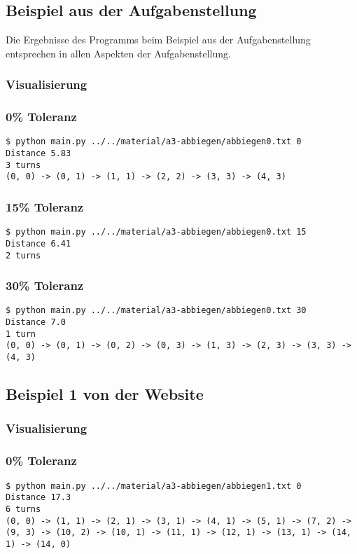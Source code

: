 \documentclass[a4paper,10pt,ngerman]{scrartcl}
\begin{document}
\subsection{Beispiel aus der Aufgabenstellung}
Die Ergebnisse des Programms beim Beispiel aus der Aufgabenstellung entsprechen in allen Aspekten der Aufgabenstellung.
\subsubsection{Visualisierung}


\subsubsection{0\% Toleranz}
\begin{lstlisting}
$ python main.py ../../material/a3-abbiegen/abbiegen0.txt 0
Distance 5.83
3 turns
(0, 0) -> (0, 1) -> (1, 1) -> (2, 2) -> (3, 3) -> (4, 3)
\end{lstlisting}

\subsubsection{15\% Toleranz}
\begin{lstlisting}
$ python main.py ../../material/a3-abbiegen/abbiegen0.txt 15
Distance 6.41
2 turns
\end{lstlisting}

\subsubsection{30\% Toleranz}
\begin{lstlisting}
$ python main.py ../../material/a3-abbiegen/abbiegen0.txt 30
Distance 7.0
1 turn
(0, 0) -> (0, 1) -> (0, 2) -> (0, 3) -> (1, 3) -> (2, 3) -> (3, 3) -> (4, 3)
\end{lstlisting}

\subsection{Beispiel 1 von der Website}
\subsubsection{Visualisierung}


\subsubsection{0\% Toleranz}
\begin{lstlisting}
$ python main.py ../../material/a3-abbiegen/abbiegen1.txt 0
Distance 17.3
6 turns
(0, 0) -> (1, 1) -> (2, 1) -> (3, 1) -> (4, 1) -> (5, 1) -> (7, 2) -> (9, 3) -> (10, 2) -> (10, 1) -> (11, 1) -> (12, 1) -> (13, 1) -> (14, 1) -> (14, 0)
\end{lstlisting}
\end{document}
